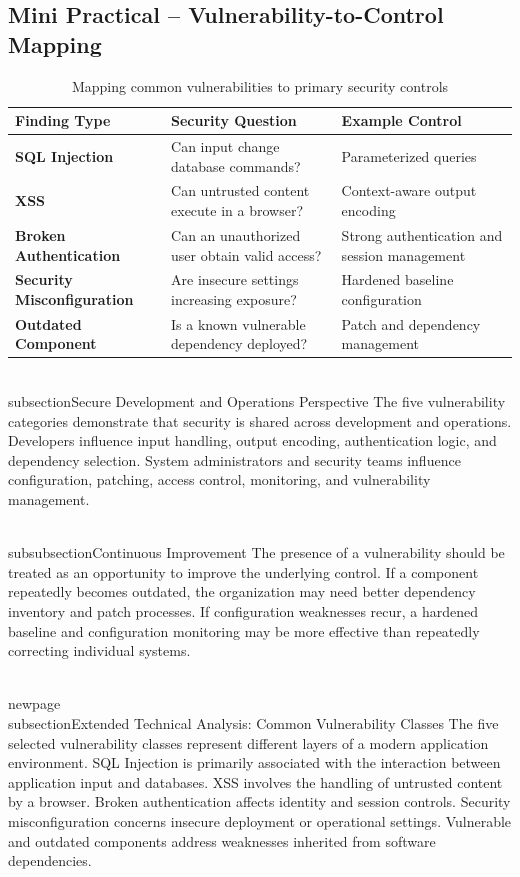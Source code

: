 \documentclass[11pt,a4paper]{article}
\begin{document}
\subsection{Mini Practical – Vulnerability-to-Control Mapping}
\begin{table}[H]\centering
\small
\begin{tabularx}{\textwidth}{>{\bfseries}p{3.0cm}X X}
\toprule
Finding Type & Security Question & Example Control\\
\midrule
SQL Injection & Can input change database commands? & Parameterized queries\\
XSS & Can untrusted content execute in a browser? & Context-aware output encoding\\
Broken Authentication & Can an unauthorized user obtain valid access? & Strong authentication and session management\\
Security Misconfiguration & Are insecure settings increasing exposure? & Hardened baseline configuration\\
Outdated Component & Is a known vulnerable dependency deployed? & Patch and dependency management\\
\bottomrule
\end{tabularx}
\caption{Mapping common vulnerabilities to primary security controls}
\end{table}

\\subsection{Secure Development and Operations Perspective}
The five vulnerability categories demonstrate that security is shared across development and operations. Developers influence input handling, output encoding, authentication logic, and dependency selection. System administrators and security teams influence configuration, patching, access control, monitoring, and vulnerability management.

\\subsubsection{Continuous Improvement}
The presence of a vulnerability should be treated as an opportunity to improve the underlying control. If a component repeatedly becomes outdated, the organization may need better dependency inventory and patch processes. If configuration weaknesses recur, a hardened baseline and configuration monitoring may be more effective than repeatedly correcting individual systems.

\\newpage
\\subsection{Extended Technical Analysis: Common Vulnerability Classes}
The five selected vulnerability classes represent different layers of a modern application environment. SQL Injection is primarily associated with the interaction between application input and databases. XSS involves the handling of untrusted content by a browser. Broken authentication affects identity and session controls. Security misconfiguration concerns insecure deployment or operational settings. Vulnerable and outdated components address weaknesses inherited from software dependencies.
\end{document}
